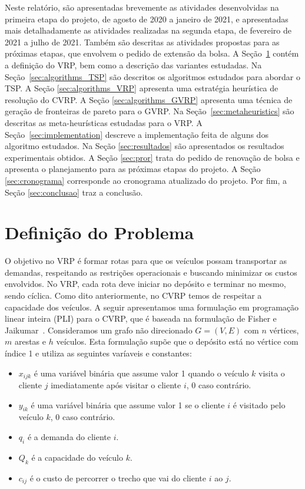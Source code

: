 \documentclass[12pt, a4paper]{article}
\begin{document}
Neste relatório, são apresentadas brevemente as atividades desenvolvidas na primeira etapa do projeto, de agosto de 2020 a janeiro de 2021, e apresentadas mais detalhadamente as atividades realizadas na segunda etapa, de fevereiro de 2021 a julho de 2021. Também são descritas as atividades propostas para as próximas etapas, que envolvem o pedido de extensão da bolsa. A Seção~\ref{sec:problem} contém a definição do VRP, bem como a descrição das variantes estudadas. Na Seção~\ref{sec:algorithms_TSP} são descritos os algoritmos estudados para abordar o TSP. A Seção \ref{sec:algorithms_VRP} apresenta uma estratégia heurística de resolução do CVRP. A Seção \ref{sec:algorithms_GVRP} apresenta uma técnica de geração de fronteiras de pareto para o GVRP. Na Seção~\ref{sec:metaheuristics} são descritas as meta-heurísticas estudadas para o VRP. A Seção~\ref{sec:implementation} descreve a implementação feita de alguns dos algoritmo estudados. Na Seção \ref{sec:resultados} são apresentados os resultados experimentais obtidos. A Seção \ref{sec:pror} trata do pedido de renovação de bolsa e apresenta o planejamento para as próximas etapas do projeto. A Seção \ref{sec:cronograma} corresponde ao cronograma atualizado do projeto. Por fim, a Seção \ref{sec:conclusao} traz a conclusão.


\section{Definição do Problema} \label{sec:problem}

O objetivo no VRP é formar rotas para que os veículos possam transportar as demandas, respeitando as restrições operacionais e buscando minimizar os custos envolvidos. No VRP, cada rota deve iniciar no depósito e terminar no mesmo, sendo cíclica. Como dito anteriormente, no CVRP temos de respeitar a capacidade dos veículos. A seguir apresentamos uma formulação em programação linear inteira (PLI) para o CVRP, que é baseada na formulação de Fisher e Jaikumar~\cite{fisher1981generalized}. Consideramos um grafo não direcionado $G = (V, E)$ com $n$ vértices, $m$ arestas e $h$ veículos. Esta formulação supõe que o depósito está no vértice com índice 1 e utiliza as seguintes varíaveis e constantes:
%
\begin{itemize}
\item $x_{ijk}$ é uma variável binária que assume valor 1 quando o veículo $k$ visita o cliente $j$ imediatamente após visitar o cliente $i$, 0 caso contrário.
\item $y_{ik}$ é uma variável binária que assume valor 1 se o cliente $i$ é visitado pelo veículo $k$, 0 caso contrário.
\item $q_{i}$ é a demanda do cliente $i$.
\item $Q_{k}$ é a capacidade do veículo $k$.
\item $c_{ij}$ é o custo de percorrer o trecho que vai do cliente $i$ ao $j$.
\end{itemize}
\end{document}
